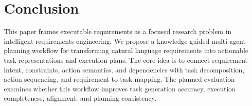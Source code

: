 \section{Conclusion}
\label{conclusion}

This paper frames executable requirements as a focused research problem in intelligent requirements engineering.
We propose a knowledge-guided multi-agent planning workflow for transforming natural language requirements into actionable task representations and execution plans.
The core idea is to connect requirement intent, constraints, action semantics, and dependencies with task decomposition, action sequencing, and requirement-to-task mapping.
The planned evaluation examines whether this workflow improves task generation accuracy, execution completeness, alignment, and planning consistency.
